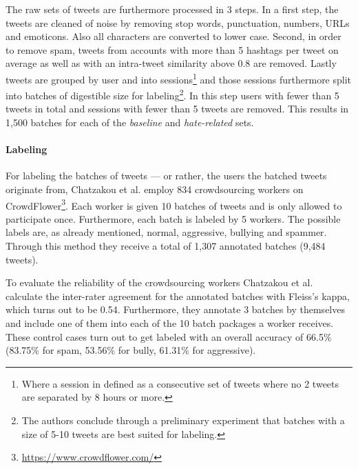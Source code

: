 \documentclass{proseminar}
\begin{document}
The raw sets of tweets are furthermore processed in 3 steps. In a first step, the tweets are cleaned of noise by removing stop words, punctuation, numbers, URLs and emoticons. Also all characters are converted to lower case. Second, in order to remove spam, tweets from accounts with more than 5 hashtags per tweet on average as well as with an intra-tweet similarity above 0.8 are removed. Lastly tweets are grouped by user and into sessions\footnote{Where a session in defined as a consecutive set of tweets where no 2 tweets are separated by 8 hours or more.} and those sessions furthermore split into batches of digestible size for labeling\footnote{The authors conclude through a preliminary experiment that batches with a size of 5-10 tweets are best suited for labeling.}. In this step users with fewer than 5 tweets in total and sessions with fewer than 5 tweets are removed. This results in 1,500 batches for each of the \emph{baseline} and \emph{hate-related} sets.

\paragraph{Labeling} For labeling the batches of tweets --- or rather, the users the batched tweets originate from, Chatzakou et al. employ 834 crowdsourcing workers on CrowdFlower\footnote{\url{https://www.crowdflower.com/}}. Each worker is given 10 batches of tweets and is only allowed to participate once. Furthermore, each batch is labeled by 5 workers. The possible labels are, as already mentioned, normal, aggressive, bullying and spammer. Through this method they receive a total of 1,307 annotated batches (9,484 tweets).

To evaluate the reliability of the crowdsourcing workers Cha\-tzakou et al. calculate the inter-rater agreement for the annotated batches with Fleiss's kappa, which turns out to be 0.54. Furthermore, they annotate 3 batches by themselves and include one of them into each of the 10 batch packages a worker receives. These control cases turn out to get labeled with an overall accuracy of 66.5\% (83.75\% for spam, 53.56\% for bully, 61.31\% for aggressive).
\end{document}
